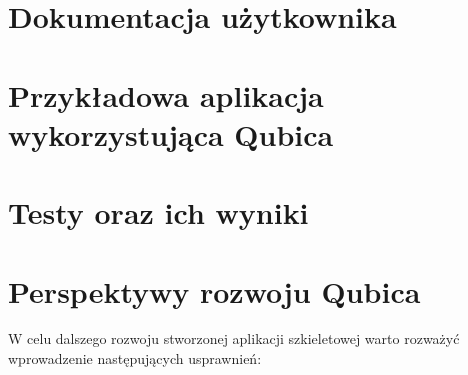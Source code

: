 \documentclass[12pt]{report}
\begin{document}
\section{Dokumentacja użytkownika}

\section{Przykładowa aplikacja wykorzystująca Qubica}

\section{Testy oraz ich wyniki}

\section{Perspektywy rozwoju Qubica}

W celu dalszego rozwoju stworzonej aplikacji szkieletowej warto rozważyć wprowadzenie następujących usprawnień:
\end{document}
